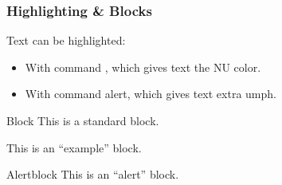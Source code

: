 \documentclass[9pt]{beamer}
\begin{document}
\begin{frame}
  \frametitle{Highlighting \& Blocks}

  Text can be highlighted:
  \begin{itemize}
    \item With command , which gives text the NU color.
    \item With command \alert{alert}, which gives text extra umph.
  \end{itemize}

  \begin{block}{Block}
    This is a standard block.
  \end{block}

  \begin{example}
    This is an ``example''  block.
  \end{example}

  \begin{alertblock}{Alertblock}
    This is an ``alert''  block.
  \end{alertblock}

\end{frame}

\hidelogo
\end{document}
